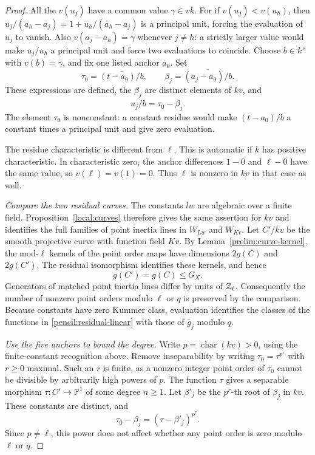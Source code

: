 \begin{proof}
All the $v(u_j)$ have a common value $\gamma\in vk$.
For if $v(u_j)<v(u_h)$, then
$u_j/(a_h-a_j)=1+u_h/(a_h-a_j)$ is a principal unit, forcing the
evaluation of $u_j$ to vanish.
Also $v(a_j-a_h)=\gamma$ whenever $j\ne h$:
a strictly larger value would make $u_j/u_h$ a principal unit and
force two evaluations to coincide.
Choose $b\in k^\times$ with $v(b)=\gamma$, and fix one listed anchor
$a_0$.  Set
\[
 \tau_0=\overline{(t-a_0)/b},\qquad
 \beta_j=\overline{(a_j-a_0)/b}.
\]
These expressions are defined, the $\beta_j$ are distinct elements of
$kv$, and
\begin{equation}\label{pencil:residual-linear}
 \overline{u_j/b}=\tau_0-\beta_j.
\end{equation}
The element $\tau_0$ is nonconstant: a constant residue would make
$(t-a_0)/b$ a constant times a principal unit and give zero evaluation.

The residue characteristic is different from $\ell$.
This is automatic if $k$ has positive characteristic.
In characteristic zero, the anchor differences $1-0$ and $\ell-0$
have the same value, so $v(\ell)=v(1)=0$.
Thus $\ell$ is nonzero in $kv$ in that case as well.

\emph{Compare the two residual curves.}
The constants $lw$ are algebraic over a finite field.
Proposition~\ref{local:curves} therefore gives the same assertion for $kv$
and identifies the full families of point inertia lines in
$W_{Lw}$ and $W_{Kv}$.
Let $C'/kv$ be the smooth projective curve with function field $Kv$.
By Lemma~\ref{prelim:curve-kernel}, the mod-$\ell$ kernels of the point
order maps have dimensions $2g(C)$ and $2g(C')$.
The residual isomorphism identifies these kernels, and hence
\begin{equation}\label{pencil:genus}
 g(C')=g(C)\le G_X.
\end{equation}
Generators of matched point inertia lines differ by units of $\mathbb Z_\ell$.
Consequently the number of nonzero point orders modulo $\ell$ or $q$
is preserved by the comparison.
Because constants have zero Kummer class, evaluation identifies the
classes of the functions in \eqref{pencil:residual-linear} with those
of $\overline g_j$ modulo $q$.

\emph{Use the five anchors to bound the degree.}
Write $p=\operatorname{char}(kv)>0$, using the finite-constant
recognition above.
Remove inseparability by writing $\tau_0=\tau^{p^r}$ with $r\ge0$
maximal.  Such an $r$ is finite, as a nonzero integer point order of
$\tau_0$ cannot be divisible by arbitrarily high powers of $p$.
The function $\tau$ gives a separable morphism
$\tau:C'\to\mathbb P^1$ of some degree $n\ge1$.
Let $\beta'_j$ be the $p^r$-th root of $\beta_j$ in $kv$.
These constants are distinct, and
\[
 \tau_0-\beta_j=(\tau-\beta'_j)^{p^r}.
\]
Since $p\ne\ell$, this power does not affect whether any point order
is zero modulo $\ell$ or $q$.


\end{proof}
